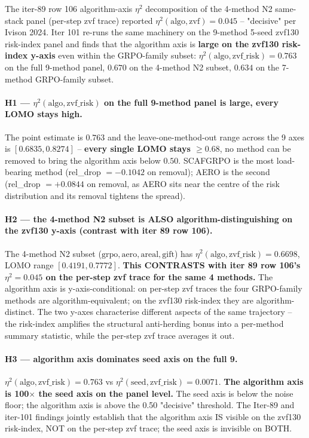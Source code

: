 \documentclass{article}  \usepackage[preprint,nonatbib]{neurips_2026} \usepackage[numbers]{natbib}
\begin{document}
The iter-89 row 106 algorithm-axis $\eta^2$ decomposition of the
4-method N2 same-stack panel (per-step zvf trace) reported
$\eta^2(\mathrm{algo}, \mathrm{zvf}) = 0.045$ -- "decisive" per Ivison
2024. Iter 101 re-runs the same machinery on the 9-method 5-seed
zvf130 risk-index panel and finds that the algorithm axis is
\textbf{large on the zvf130 risk-index y-axis} even within the
GRPO-family subset:
$\eta^2(\mathrm{algo}, \mathrm{zvf\_risk}) = 0.763$ on the full
9-method panel, $0.670$ on the 4-method N2 subset, $0.634$ on the
7-method GRPO-family subset.

\paragraph{H1 --- $\eta^2(\mathrm{algo}, \mathrm{zvf\_risk})$ on the
full 9-method panel is large, every LOMO stays high.}
The point estimate is $0.763$ and the leave-one-method-out range
across the 9 axes is $[0.6835, 0.8274]$ -- \textbf{every single LOMO
stays $\geq 0.68$}, no method can be removed to bring the algorithm
axis below $0.50$. SCAFGRPO is the most load-bearing method
(rel\_drop $= -0.1042$ on removal); AERO is the second
(rel\_drop $= +0.0844$ on removal, as AERO sits near the centre of
the risk distribution and its removal tightens the spread).

\paragraph{H2 --- the 4-method N2 subset is ALSO algorithm-distinguishing
on the zvf130 y-axis (contrast with iter 89 row 106).}
The 4-method N2 subset ($\mathrm{grpo, aero, areal, gift}$)
has $\eta^2(\mathrm{algo}, \mathrm{zvf\_risk}) = 0.6698$, LOMO range
$[0.4191, 0.7772]$. \textbf{This CONTRASTS with iter 89 row 106's
$\eta^2 = 0.045$ on the per-step zvf trace for the same 4 methods.}
The algorithm axis is y-axis-conditional: on per-step zvf traces
the four GRPO-family methods are algorithm-equivalent; on the
zvf130 risk-index they are algorithm-distinct. The two y-axes
characterise different aspects of the same trajectory -- the
risk-index amplifies the structural anti-herding bonus into a
per-method summary statistic, while the per-step zvf trace averages
it out.

\paragraph{H3 --- algorithm axis dominates seed axis on the full 9.}
$\eta^2(\mathrm{algo}, \mathrm{zvf\_risk}) = 0.763$ vs
$\eta^2(\mathrm{seed}, \mathrm{zvf\_risk}) = 0.0071$. \textbf{The
algorithm axis is 100$\times$ the seed axis on the panel level.}
The seed axis is below the noise floor; the algorithm axis is
above the 0.50 "decisive" threshold. The Iter-89 and iter-101
findings jointly establish that the algorithm axis IS visible on
the zvf130 risk-index, NOT on the per-step zvf trace; the seed
axis is invisible on BOTH.
\end{document}
